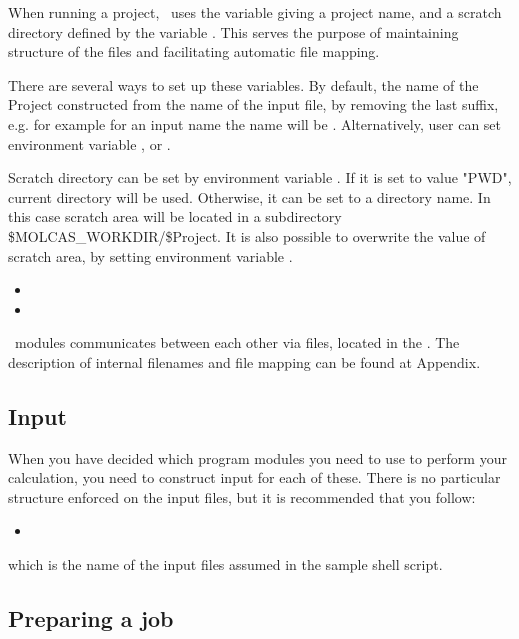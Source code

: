 When running a project, \molcas\ uses the variable
 giving a project name, and a scratch directory defined by
the variable .
This serves the purpose of maintaining structure of the files and
facilitating automatic file mapping.

There are several ways to set up these variables.
By default, the name of the Project constructed from the name of the input file,
by removing the last suffix, e.g. for example for an input name 
the  name will be .
Alternatively,
user can set environment variable , or .

Scratch directory can be set by environment variable .
If it is set to value "PWD", current directory will be used. Otherwise,
it can be set to a directory name. In this case scratch area will be located
in a subdirectory \$MOLCAS\_WORKDIR/\$Project. It is also possible to
overwrite the value of scratch area, by setting environment variable
.

\begin{itemize}
\itemsep 9pt plus 3pt minus 3pt
\item {}
\item {}
\end{itemize}

\molcas\ modules communicates between each other via files, located in the .
The description of internal filenames and file mapping can be found at Appendix.

\subsection{Input}

When you have decided which program modules you need to use to perform your
calculation, you need to construct input for each of these. There is no
particular structure enforced on the input files, but it is recommended that
you follow:
\begin{itemize}
\item {}
\end{itemize}
which is the name of the input files assumed in the sample shell script.


\subsection{Preparing a job}

